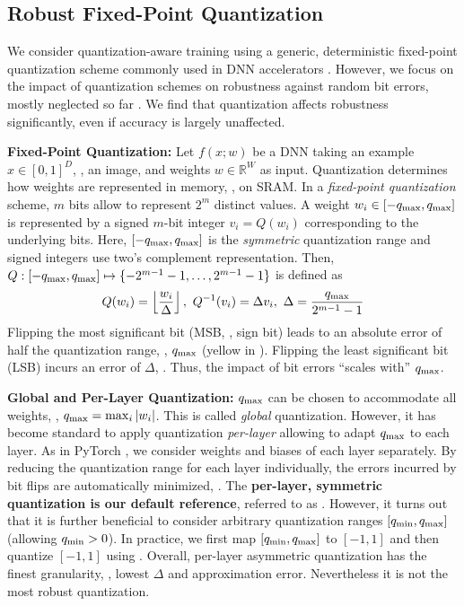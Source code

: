 \subsection{Robust Fixed-Point Quantization}
\label{subsec:robustness-quantization}

We consider quantization-aware training \cite{JacobCVPR2018,KrishnamoorthiARXIV2018} using a generic, deterministic fixed-point quantization scheme commonly used in DNN accelerators \cite{ChandramoorthyHPCA2019}. However, we focus on the impact of quantization schemes on robustness against random bit errors, mostly neglected so far \cite{MurthyARXIV2019,MerollaARXIV2016,SungARXIV2015}. We find that quantization affects robustness significantly, even if accuracy is largely unaffected.

\textbf{Fixed-Point Quantization:} Let $f(x; w)$ be a DNN taking an example $x \in [0, 1]^D$, \eg, an image, and weights $w \in \mathbb{R}^W$ as input. Quantization determines how weights are represented in memory, \eg, on SRAM. In a \emph{fixed-point quantization} scheme, $m$ bits allow to represent $2^m$ distinct values. 
A weight $w_i \in [-\qmax, \qmax]$ 
is represented by a signed $m$-bit integer $v_i = Q(w_i)$ corresponding to the underlying bits. Here, $[-\qmax, \qmax]$ is the \emph{symmetric} quantization range and signed integers use two's complement representation. Then, $Q: [-\qmax, \qmax] \mapsto \{-2^{m - 1} - 1, \ldots, 2^{m - 1} - 1\}$ is defined as 
\begin{align}
    Q(w_i) = \left\lfloor \frac{w_i}{\Delta}\right\rfloor,\text{  }
    Q^{-1}(v_i) = \Delta v_i,\text{  }
    \Delta = \frac{\qmax}{2^{m - 1} - 1}
    \label{eq:quantization}
\end{align}
Flipping the most significant bit (MSB, \ie, sign bit) leads to an absolute error of half the quantization range, \ie, $\qmax$ ({\color{yellow!75!black!}yellow} in ).
Flipping the least significant bit (LSB) incurs an error of $\Delta$, \cf {}. Thus, the impact of bit errors ``scales with'' $\qmax$.

\textbf{Global and Per-Layer Quantization:} $\qmax$ can be chosen to accommodate all weights, \ie, $\qmax = \max_i |w_i|$. This is called \emph{global} quantization. However, it has become standard to apply quantization \textit{per-layer} allowing to adapt $\qmax$ to each layer. As in PyTorch \cite{PaszkeNIPSWORK2017}, we consider weights and biases of each layer separately. By reducing the quantization range for each layer individually, the errors incurred by bit flips are automatically minimized, \cf {}. The
\textbf{per-layer, symmetric quantization is our default reference}, referred to as \Normal. However, it turns out that it is further beneficial to consider arbitrary quantization ranges $[\qmin, \qmax]$ (allowing $\qmin > 0$). In practice, we
first map $[\qmin, \qmax]$ to $[-1,1]$ and then quantize $[-1,1]$ using .
Overall, per-layer asymmetric quantization has the finest granularity, \ie, lowest $\Delta$ and approximation error. Nevertheless it is not the most robust
quantization.

